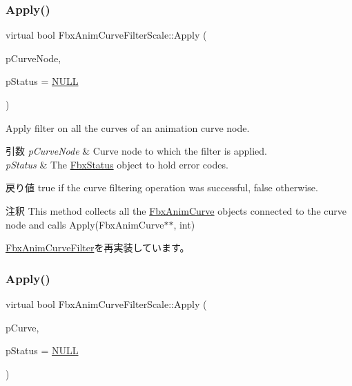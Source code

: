 \subsubsection{\texorpdfstring{Apply()}{Apply()}\hspace{0.1cm}{\footnotesize\ttfamily [4/5]}}
{\footnotesize\ttfamily virtual bool Fbx\+Anim\+Curve\+Filter\+Scale\+::\+Apply (\begin{DoxyParamCaption}\item[{\hyperlink{class_fbx_anim_curve_node}{Fbx\+Anim\+Curve\+Node} \&}]{p\+Curve\+Node,  }\item[{\hyperlink{class_fbx_status}{Fbx\+Status} $\ast$}]{p\+Status = {\ttfamily \hyperlink{fbxarch_8h_a070d2ce7b6bb7e5c05602aa8c308d0c4}{N\+U\+LL}} }\end{DoxyParamCaption})\hspace{0.3cm}{\ttfamily [virtual]}}

Apply filter on all the curves of an animation curve node. 
\begin{DoxyParams}{引数}
{\em p\+Curve\+Node} & Curve node to which the filter is applied. \\
\hline
{\em p\+Status} & The \hyperlink{class_fbx_status}{Fbx\+Status} object to hold error codes. \\
\hline
\end{DoxyParams}
\begin{DoxyReturn}{戻り値}
{\ttfamily true} if the curve filtering operation was successful, {\ttfamily false} otherwise. 
\end{DoxyReturn}
\begin{DoxyRemark}{注釈}
This method collects all the \hyperlink{class_fbx_anim_curve}{Fbx\+Anim\+Curve} objects connected to the curve node and calls Apply(\+Fbx\+Anim\+Curve$\ast$$\ast$, int) 
\end{DoxyRemark}


\hyperlink{class_fbx_anim_curve_filter_ad042b45c0675278fa49e61739b0825c2}{Fbx\+Anim\+Curve\+Filter}を再実装しています。

\mbox{\label{class_fbx_anim_curve_filter_scale_a1d3234359a5766b4476e4a0522104d77}} 
\subsubsection{\texorpdfstring{Apply()}{Apply()}\hspace{0.1cm}{\footnotesize\ttfamily [5/5]}}
{\footnotesize\ttfamily virtual bool Fbx\+Anim\+Curve\+Filter\+Scale\+::\+Apply (\begin{DoxyParamCaption}\item[{\hyperlink{class_fbx_anim_curve}{Fbx\+Anim\+Curve} \&}]{p\+Curve,  }\item[{\hyperlink{class_fbx_status}{Fbx\+Status} $\ast$}]{p\+Status = {\ttfamily \hyperlink{fbxarch_8h_a070d2ce7b6bb7e5c05602aa8c308d0c4}{N\+U\+LL}} }\end{DoxyParamCaption})\hspace{0.3cm}{\ttfamily [virtual]}}

